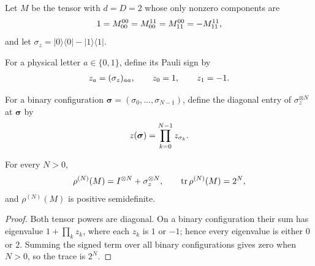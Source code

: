 \begin{definition}
    \label{def:cpsv_example412_literal_tensor}
    \leanok
    Let $M$ be the tensor with $d=D=2$ whose only nonzero components are
    \begin{align}
        1=M_{00}^{00}=M_{00}^{11}=M_{11}^{00}=-M_{11}^{11},
        \notag
    \end{align}
    and let
    $\sigma_z=|0\rangle\langle0|-|1\rangle\langle1|$.
\end{definition}

\begin{definition}
    \label{def:cpsv_example412_site_sign}
    \leanok
    For a physical letter $a\in\{0,1\}$, define its Pauli sign by
    \begin{align}
        z_a=(\sigma_z)_{aa},
        \qquad z_0=1,
        \qquad z_1=-1.
        \notag
    \end{align}
\end{definition}

\begin{definition}
    \label{def:cpsv_example412_configuration_sign}
    \leanok
    For a binary configuration
    $\boldsymbol\sigma=(\sigma_0,\ldots,\sigma_{N-1})$, define the diagonal
    entry of $\sigma_z^{\otimes N}$ at $\boldsymbol\sigma$ by
    \begin{align}
        z(\boldsymbol\sigma)=\prod_{k=0}^{N-1}z_{\sigma_k}.
        \notag
    \end{align}
\end{definition}

\begin{lemma}
    \label{thm:cpsv_example412_literal_formula}
    \leanok
    For every $N>0$,
    \begin{align}
        \rho^{(N)}(M)=I^{\otimes N}+\sigma_z^{\otimes N},
        \qquad
        \operatorname{tr}\rho^{(N)}(M)=2^N,
        \notag
    \end{align}
    and $\rho^{(N)}(M)$ is positive semidefinite.
\end{lemma}
\begin{proof}\leanok
    Both tensor powers are diagonal.  On a binary configuration their sum has
    eigenvalue $1+\prod_k z_k$, where each $z_k$ is $1$ or $-1$; hence every
    eigenvalue is either $0$ or $2$.  Summing the signed term over all binary
    configurations gives zero when $N>0$, so the trace is $2^N$.
\end{proof}

